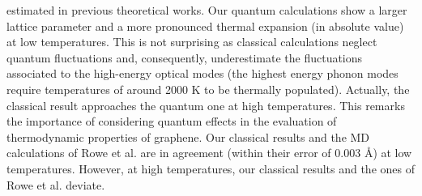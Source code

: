 estimated in previous theoretical works\cite{rowe2018development,zakharchenko2009finite}. Our quantum calculations 
show a larger lattice parameter and a more pronounced thermal expansion (in absolute value) at low temperatures. This 
is not surprising as classical calculations neglect quantum fluctuations and, consequently, underestimate the 
fluctuations associated to the high-energy optical modes (the highest energy phonon modes require temperatures of 
around 2000 K to be thermally populated). Actually, the classical result approaches the quantum one at high 
temperatures. This remarks the importance of considering quantum effects in the evaluation of thermodynamic 
properties of graphene. Our classical results and the MD calculations of Rowe et al.\cite{rowe2018development} are 
in agreement (within their error of $0.003$ \AA) at low temperatures. However, at high temperatures, our classical 
results and the ones of Rowe et al.\cite{rowe2018development} deviate. \\

